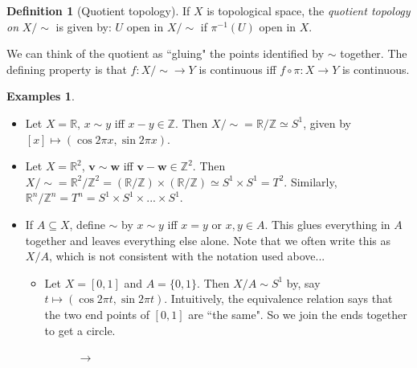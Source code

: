 \documentclass[a4paper,11pt]{article}
\theoremstyle{definition}
\newtheorem*{defn}{Definition}
\newtheorem*{exs}{Examples}
\numberwithin{equation}{section}
\begin{document}
\begin{defn}[Quotient topology]
    If $X$ is topological space, the \emph{quotient topology on} $X/\sim$ is given by: $U$ open in $X/\sim$ if $\pi^{-1}(U)$ open in $X$.
\end{defn}

We can think of the quotient as ``gluing" the points identified by $\sim$ together. The defining property is that $f:X/\sim\rightarrow Y$ is continuous iff $f\circ\pi:X\rightarrow Y$ is continuous.


\begin{exs}
\leavevmode
\begin{itemize}
    \item Let $X=\mathbb{R}$, $x\sim y$ iff $x-y\in\mathbb{Z}$. Then $X/\sim=\mathbb{R}/\mathbb{Z}\simeq S^1$, given by $[x]\mapsto(\cos 2\pi x,\sin2\pi x)$.
    \item Let $X=\mathbb{R}^2$, $\mathbf{v}\sim\mathbf{w}$ iff $\mathbf{v}-\mathbf{w}\in\mathbb{Z}^2$. Then $X/\sim=\mathbb{R}^2/\mathbb{Z}^2=(\mathbb{R}/\mathbb{Z})\times(\mathbb{R}/\mathbb{Z})\simeq S^1\times S^1=T^2$. Similarly, $\mathbb{R}^n/\mathbb{Z}^n=T^n=S^1\times S^1\times...\times S^1$.
    \item If $A\subseteq X$, define $\sim$ by $x\sim y$ iff $x=y$ or $x,y\in A$. This glues everything in $A$ together and leaves everything else alone. Note that we often write this as $X/A$, which is not consistent with the notation used above...
    \begin{itemize}
        \item Let $X=[0,1]$ and $A=\{0,1\}$. Then $X/A\sim S^1$ by, say $t\mapsto(\cos2\pi t,\sin2\pi t)$. Intuitively, the equivalence relation says that the two end points of $[0,1]$ are ``the same". So we join the ends together to get a circle.
        \begin{figure}[h]
            \centering
            \begin{minipage}{.47\textwidth}
            \centering
            \end{minipage}
            \LARGE$\rightarrow$
            \begin{minipage}{.47\textwidth}
            \centering
            \end{minipage}
        \end{figure}
        

\end{itemize}
\end{itemize}
\end{exs}
\end{document}
